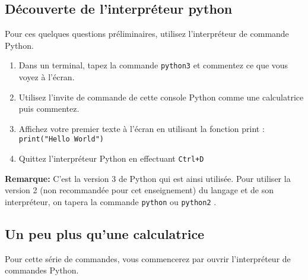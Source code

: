 
\subsection{Découverte de l'interpréteur python}

Pour ces quelques questions  préliminaires, utilisez l'interpréteur de
commande Python.

\begin{enumerate}

\item Dans un terminal, tapez la commande \texttt{python3} et commentez
  ce que vous voyez à l'écran.

\item Utilisez l'invite de commande  de cette console Python comme une
  calculatrice puis commentez.

\item Affichez votre premier texte  à l'écran en utilisant la fonction
  print : \\ \texttt{print("Hello World")}

\item Quittez l'interpréteur Python en effectuant \texttt{Ctrl+D}

\end{enumerate}

\noindent \textbf{Remarque:} C'est la version 3 de Python qui est ainsi utilisée.
Pour utiliser la version 2 (non recommandée pour cet enseignement) du langage et de son interpréteur,
on tapera la commande \texttt{python} ou \texttt{python2} .


\subsection{Un peu plus qu'une calculatrice}

Pour   cette  série   de   commandes,  vous   commencerez  par   ouvrir
l'interpréteur de commandes Python.

